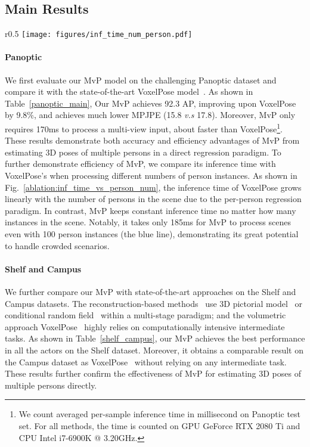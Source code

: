 \documentclass{article}
\begin{document}
\subsection{Main Results}
\begin{wrapfigure}{r}{0.5\textwidth}
\centering
\texttt{[image: figures/inf\_time\_num\_person.pdf]}
\caption{Inference time versus the number of person instances. Benefiting from its direct inference framework, MvP maintains almost constant inference time regardless of the number of persons.}
\label{ablation:inf_time_vs_person_num}
\end{wrapfigure}
\paragraph{Panoptic} 
We first evaluate our MvP model on the challenging Panoptic dataset and compare it with the state-of-the-art VoxelPose model~\cite{Tu2020}.
As shown in Table~\ref{panoptic_main}, Our MvP achieves 92.3 AP, improving upon VoxelPose by 9.8\%, and achieves   much lower MPJPE (15.8 \textit{v.s} 17.8). 
Moreover,  MvP only requires 170ms to process a multi-view input, about  faster than VoxelPose\footnote{We count averaged per-sample inference time in millisecond on Panoptic test set. For all methods, the time is counted on GPU GeForce RTX 2080 Ti and CPU Intel i7-6900K @ 3.20GHz.}. These results demonstrate both accuracy and efficiency advantages  of MvP from estimating 3D poses of multiple persons in a direct regression paradigm.
To further demonstrate   efficiency of MvP, we compare its inference time  with VoxelPose's when processing different numbers of person instances.
As shown in Fig.~\ref{ablation:inf_time_vs_person_num}, the inference time of VoxelPose grows linearly with the number of persons in the scene due to the per-person regression paradigm. In contrast, MvP keeps constant inference time no matter how many instances in the scene. Notably, it takes only 185ms for MvP to process scenes even with 100 person instances (the blue line),  demonstrating its great potential to handle crowded scenarios.



\paragraph{Shelf and Campus} 
We further compare our MvP with state-of-the-art approaches on the Shelf and Campus datasets.
The reconstruction-based methods~\cite{belagiannis20153d,ershadi2018multiple,dong2019fast} use 3D pictorial model~\cite{belagiannis20153d,dong2019fast} or conditional random field~\cite{ershadi2018multiple} within a multi-stage paradigm; and the volumetric approach VoxelPose~\cite{Tu2020} highly relies on computationally intensive intermediate tasks. As shown in Table~\ref{shelf_campus}, our MvP achieves the best performance in all the actors on the Shelf dataset. Moreover, it obtains a comparable result on the Campus dataset as VoxelPose~\cite{Tu2020} without relying on any intermediate task. These results further confirm the effectiveness of MvP for estimating 3D poses of multiple persons directly.
\end{document}
